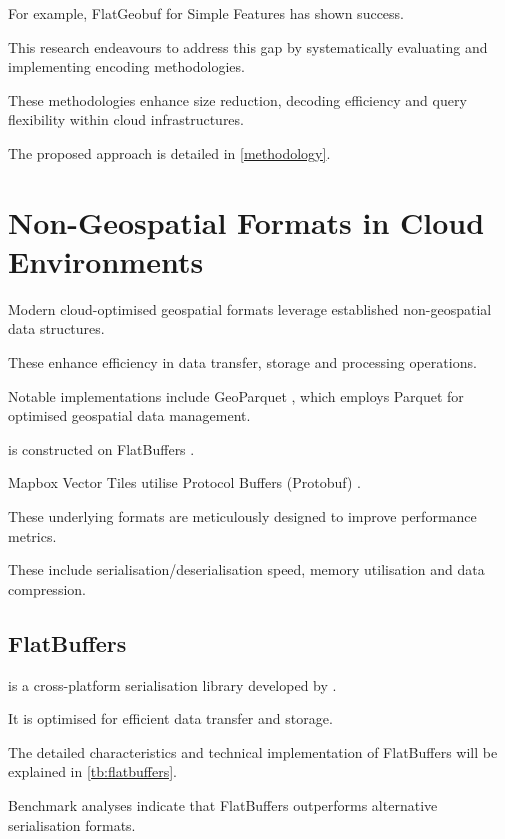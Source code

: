 For example, FlatGeobuf for Simple Features \citep{flatgeobuf} has shown success.

This research endeavours to address this gap by systematically evaluating and implementing encoding methodologies.

These methodologies enhance size reduction, decoding efficiency and query flexibility within cloud infrastructures.

The proposed approach is detailed in \autoref{methodology}.

\section{Non-Geospatial Formats in Cloud Environments}
\label{rw:non_geospatial_formats}

Modern cloud-optimised geospatial formats leverage established non-geospatial data structures.

These enhance efficiency in data transfer, storage and processing operations.

Notable implementations include GeoParquet \citep{geoparquet}, which employs Parquet \citep{parquet} for optimised geospatial data management.

\citet{flatgeobuf} is constructed on FlatBuffers \citep{flatbuffers}.

Mapbox Vector Tiles \citep{mapbox-vector-tiles} utilise Protocol Buffers (Protobuf) \citep{protobuf}.

These underlying formats are meticulously designed to improve performance metrics.

These include serialisation/deserialisation speed, memory utilisation and data compression.

\subsection{FlatBuffers}
\label{rw:non_geospatial_formats:flatbuffers}

\citet{flatbuffers} is a cross-platform serialisation library developed by \citet{google_flatbuffers}.

It is optimised for efficient data transfer and storage.

The detailed characteristics and technical implementation of FlatBuffers will be explained in \autoref{tb:flatbuffers}.

Benchmark analyses \citep{flatbuffers_benchmark} indicate that FlatBuffers outperforms alternative serialisation formats.

